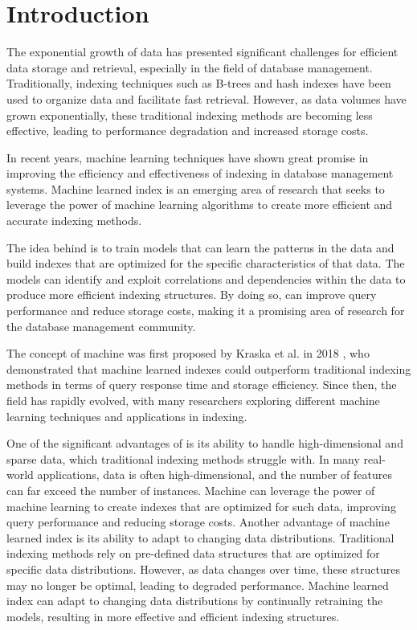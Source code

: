 
\chapter{Introduction}

The exponential growth of data has presented significant challenges for efficient data storage and retrieval, especially in the field of database management. Traditionally, indexing techniques such as B-trees and hash indexes have been used to organize data and facilitate fast retrieval. However, as data volumes have grown exponentially, these traditional indexing methods are becoming less effective, leading to performance degradation and increased storage costs.

In recent years, machine learning techniques have shown great promise in improving the efficiency and effectiveness of indexing in database management systems. Machine learned index is an emerging area of research that seeks to leverage the power of machine learning algorithms to create more efficient and accurate indexing methods.

The idea behind \learnindex is to train models that can learn the patterns in the data and build indexes that are optimized for the specific characteristics of that data. The models can identify and exploit correlations and dependencies within the data to produce more efficient indexing structures. By doing so, \learnindex can improve query performance and reduce storage costs, making it a promising area of research for the database management community.

The concept of machine \learnindex was first proposed by Kraska et al. in 2018 \cite{CasedLearnedIndex}, who demonstrated that machine learned indexes could outperform traditional indexing methods in terms of query response time and storage efficiency. Since then, the field has rapidly evolved, with many researchers exploring different machine learning techniques and applications in indexing.

One of the significant advantages of \learnindex is its ability to handle high-dimensional and sparse data, which traditional indexing methods struggle with. In many real-world applications, data is often high-dimensional, and the number of features can far exceed the number of instances. Machine \learnindex can leverage the power of machine learning to create indexes that are optimized for such data, improving query performance and reducing storage costs. Another advantage of machine learned index is its ability to adapt to changing data distributions. Traditional indexing methods rely on pre-defined data structures that are optimized for specific data distributions. However, as data changes over time, these structures may no longer be optimal, leading to degraded performance. Machine learned index can adapt to changing data distributions by continually retraining the models, resulting in more effective and efficient indexing structures. 

